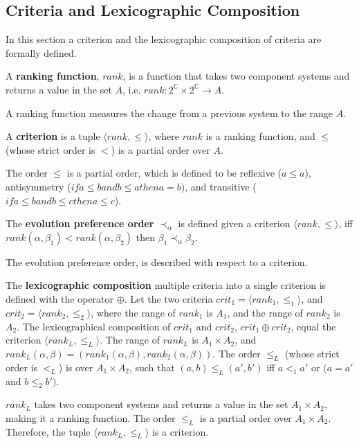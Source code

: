 \subsection{Criteria and Lexicographic Composition}
In this section a criterion and the lexicographic composition of criteria are formally defined.

\begin{defs}
A \textbf{ranking function}, $rank$, is a function that takes two component systems and returns a value in the set $A$, i.e. $rank : 2^{\mathbb{C}} \times 2^{\mathbb{C}} \rightarrow A$.
\end{defs}
A ranking function measures the change from a previous system to the range $A$.

\begin{defs}
\label{formal.defcriteria}
A \textbf{criterion} is a tuple $\langle rank, \leq \rangle$, where $rank$ is a ranking function, and $\leq$ (whose strict order is $<$) is a partial order over $A$.
\end{defs}
The order $\leq$ is a partial order, which is defined to be reflexive ($a \leq a$), antisymmetry ($if a \leq b and b \leq a then a = b$), and transitive ($if a \leq b and b \leq c then a \leq c$).

\begin{defs}
\label{formal.defcrittooptimal}
The \textbf{evolution preference order} $\prec_{\alpha}$ is defined given a criterion $\langle rank, \leq \rangle$, 
iff $rank(\alpha,\beta_1) < rank(\alpha,\beta_2)$ then $\beta_1 \prec_{\alpha} \beta_2$.
\end{defs}
The evolution preference order, is described with respect to a criterion.


\begin{defs}
\label{formal.defcritlex}
The \textbf{lexicographic composition} multiple criteria into a single criterion is defined with the operator $\oplus$.
Let the two criteria $crit_1 = \langle rank_1, \leq_{1} \rangle$, and $crit_2 = \langle rank_2, \leq_{2} \rangle$,
where the range of $rank_1$ is $A_1$, and the range of $rank_2$ is $A_2$.
The lexicographical composition of $crit_1$ and $crit_2$, $crit_1 \oplus crit_2$, equal the criterion $\langle rank_L,\leq_L \rangle$.
The range of $rank_L$ is $A_1 \times A_2$, and $rank_L(\alpha,\beta) = (rank_1(\alpha,\beta),rank_2(\alpha,\beta))$.
The order $\leq_L$ (whose strict order is $<_L$) is over $A_1 \times A_2$, such that $(a,b) \leq_L (a',b')$ iff $a <_1 a'$ or $(a = a'$ and $b \leq_2 b')$.
\end{defs}
$rank_L$ takes two component systems and returns a value in the set $A_1 \times A_2$, making it a ranking function.
The order $\leq_L$ is a partial order \citep{Schroder2003} over $A_1 \times A_2$.
Therefore, the tuple $\langle rank_L,\leq_L \rangle$ is a criterion.

